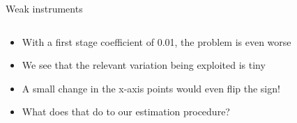 \documentclass[notes,11pt, aspectratio=169]{beamer}
\begin{document}
\begin{frame}{Weak instruments}
  \begin{columns}[T] %
    \begin{column}{0.5\textwidth}
  \begin{itemize}
  \item With a first stage coefficient of 0.01, the problem is even worse
  \item<2-> We see that the relevant variation being exploited is tiny
  \item<2-> A small change in the x-axis points would even flip the sign!
  \item<2-> What does that do to our estimation procedure?
  \end{itemize}
\end{column}
\begin{column}{0.5\textwidth}
\end{column}
\end{columns}
\end{frame}
\end{document}
